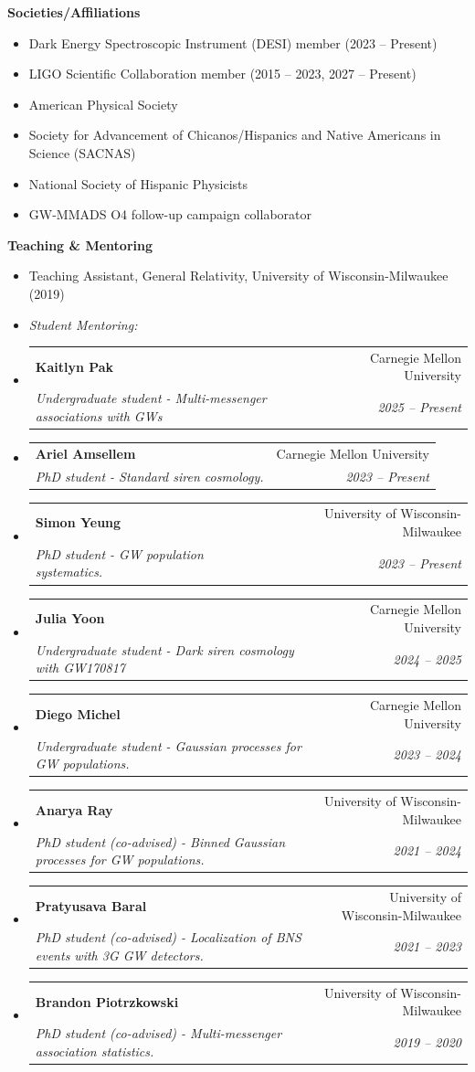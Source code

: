 \documentclass[letterpaper,10pt]{article}
\makeatletter
\newcommand{\resheading}[1]{{\large \colorbox{mygrey}{\begin{minipage}{\dimexpr\textwidth-2\fboxsep\relax}{\textbf{#1 \vphantom{p\^{E}}}}\end{minipage}}}}
\newcommand{\ressubheadinged}[4]{
\begin{tabular*}{\linewidth}{l@{\extracolsep{\fill}}r}
		\textbf{#1} & #2 \\
		\textit{#3} & \textit{#4}\\
\end{tabular*}\vspace{-3pt}}
\makeatother
\begin{document}
\resheading{Societies/Affiliations}
\begin{itemize}
	\item Dark Energy Spectroscopic Instrument (DESI) member (2023 -- Present)
	\item LIGO Scientific Collaboration member (2015 -- 2023, 2027 -- Present)
	\item American Physical Society
	\item Society for Advancement of Chicanos/Hispanics and Native Americans in Science (SACNAS)
	\item National Society of Hispanic Physicists
	\item GW-MMADS O4 follow-up campaign collaborator
\end{itemize}

\resheading{Teaching \& Mentoring}
\begin{itemize}
\item Teaching Assistant, General Relativity, University of Wisconsin-Milwaukee (2019)
\item[] \textit{Student Mentoring:}
\item
	\ressubheadinged{Kaitlyn Pak}{Carnegie Mellon University}{Undergraduate student - Multi-messenger associations with GWs}{2025 -- Present}
\item
	\ressubheadinged{Ariel Amsellem}{Carnegie Mellon University}{PhD student - Standard siren cosmology.}{2023 -- Present}
\item
	\ressubheadinged{Simon Yeung}{University of Wisconsin-Milwaukee}{PhD student - GW population systematics.}{2023 -- Present}
\item
	\ressubheadinged{Julia Yoon}{Carnegie Mellon University}{Undergraduate student - Dark siren cosmology with GW170817}{2024 -- 2025}
\item
	\ressubheadinged{Diego Michel}{Carnegie Mellon University}{Undergraduate student - Gaussian processes for GW populations.}{2023 -- 2024}
\item
	\ressubheadinged{Anarya Ray}{University of Wisconsin-Milwaukee}{PhD student (co-advised) - Binned Gaussian processes for GW populations.}{2021 -- 2024}
\item
	\ressubheadinged{Pratyusava Baral}{University of Wisconsin-Milwaukee}{PhD student (co-advised) - Localization of BNS events with 3G GW detectors.}{2021 -- 2023}
\item
	\ressubheadinged{Brandon Piotrzkowski}{University of Wisconsin-Milwaukee}{PhD student (co-advised) - Multi-messenger association statistics.}{2019 -- 2020}
\end{itemize}
\end{document}

